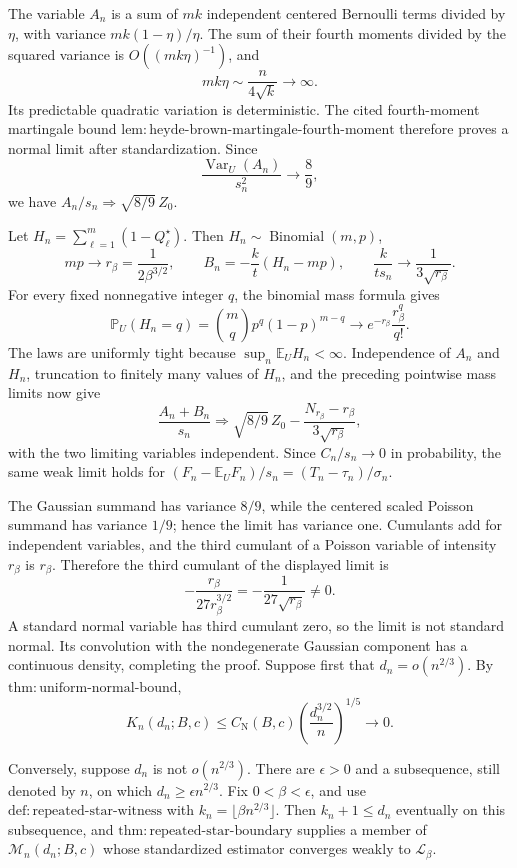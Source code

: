 The variable \(A_n\) is a sum of \(mk\) independent centered Bernoulli terms divided by \(\eta\), with variance \(mk(1-\eta)/\eta\).  The sum of their fourth moments divided by the squared variance is \(O((mk\eta)^{-1})\), and
\[
 mk\eta\sim\frac{n}{4\sqrt{k}}\longrightarrow\infty.
\]
Its predictable quadratic variation is deterministic.  The cited fourth-moment martingale bound \(\mathrm{lem:heyde\text{-}brown\text{-}martingale\text{-}fourth\text{-}moment}\) therefore proves a normal limit after standardization.  Since
\[
 \frac{\operatorname{Var}_U(A_n)}{s_n^2}\longrightarrow\frac89,
\]
we have \(A_n/s_n\Rightarrow\sqrt{8/9}\,Z_0\).

Let \(H_n=\sum_{\ell=1}^m(1-Q_\ell^\star)\).  Then \(H_n\sim\operatorname{Binomial}(m,p)\),
\[
 mp\longrightarrow r_\beta=\frac1{2\beta^{3/2}},\qquad
 B_n=-\frac{k}{t}(H_n-mp),\qquad
 \frac{k}{ts_n}\longrightarrow\frac1{3\sqrt{r_\beta}}.
\]
For every fixed nonnegative integer \(q\), the binomial mass formula gives
\[
 \mathbb P_U(H_n=q)=\binom mq p^q(1-p)^{m-q}\longrightarrow
 e^{-r_\beta}\frac{r_\beta^q}{q!}.
\]
The laws are uniformly tight because \(\sup_n\mathbb E_UH_n<\infty\).  Independence of \(A_n\) and \(H_n\), truncation to finitely many values of \(H_n\), and the preceding pointwise mass limits now give
\[
 \frac{A_n+B_n}{s_n}\Rightarrow
 \sqrt{8/9}\,Z_0-\frac{N_{r_\beta}-r_\beta}{3\sqrt{r_\beta}},
\]
with the two limiting variables independent.  Since \(C_n/s_n\to0\) in probability, the same weak limit holds for \((F_n-\mathbb E_UF_n)/s_n=(T_n-\tau_n)/\sigma_n\).

The Gaussian summand has variance \(8/9\), while the centered scaled Poisson summand has variance \(1/9\); hence the limit has variance one.  Cumulants add for independent variables, and the third cumulant of a Poisson variable of intensity \(r_\beta\) is \(r_\beta\).  Therefore the third cumulant of the displayed limit is
\[
 -\frac{r_\beta}{27r_\beta^{3/2}}=-\frac1{27\sqrt{r_\beta}}\ne0.
\]
A standard normal variable has third cumulant zero, so the limit is not standard normal.  Its convolution with the nondegenerate Gaussian component has a continuous density, completing the proof.
Suppose first that \(d_n=o(n^{2/3})\).  By \(\mathrm{thm:uniform\text{-}normal\text{-}bound}\),
\[
 K_n(d_n;B,c)\le C_{\mathrm N}(B,c)
 \left(\frac{d_n^{3/2}}n\right)^{1/5}\longrightarrow0.
\]

Conversely, suppose \(d_n\) is not \(o(n^{2/3})\).  There are \(\epsilon>0\) and a subsequence, still denoted by \(n\), on which \(d_n\ge\epsilon n^{2/3}\).  Fix \(0<\beta<\epsilon\), and use \(\mathrm{def:repeated\text{-}star\text{-}witness}\) with \(k_n=\lfloor\beta n^{2/3}\rfloor\).  Then \(k_n+1\le d_n\) eventually on this subsequence, and \(\mathrm{thm:repeated\text{-}star\text{-}boundary}\) supplies a member of \(\mathcal M_n(d_n;B,c)\) whose standardized estimator converges weakly to \(\mathcal L_\beta\).

